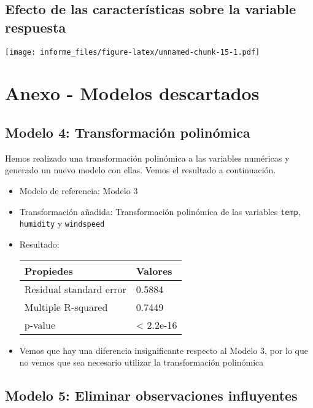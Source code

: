 \documentclass[
]{article}
\begin{document}
\hypertarget{efecto-de-las-caracteruxedsticas-sobre-la-variable-respuesta}{%
\subsection{Efecto de las características sobre la variable
respuesta}\label{efecto-de-las-caracteruxedsticas-sobre-la-variable-respuesta}}

\texttt{[image: informe\_files/figure-latex/unnamed-chunk-15-1.pdf]}

\newpage

\hypertarget{anexo---modelos-descartados}{%
\section{Anexo - Modelos
descartados}\label{anexo---modelos-descartados}}

\hypertarget{modelo-4-transformaciuxf3n-polinuxf3mica}{%
\subsection{Modelo 4: Transformación
polinómica}\label{modelo-4-transformaciuxf3n-polinuxf3mica}}

Hemos realizado una transformación polinómica a las variables numéricas
y generado un nuevo modelo con ellas. Vemos el resultado a continuación.

\begin{itemize}
\item
  Modelo de referencia: Modelo 3
\item
  Transformación añadida: Transformación polinómica de las variables
  \texttt{temp}, \texttt{humidity} y \texttt{windspeed}
\item
  Resultado:

  \begin{longtable}[]{@{}ll@{}}
  \toprule
  Propiedes & Valores\tabularnewline
  \midrule
  \endhead
  Residual standard error & 0.5884\tabularnewline
  Multiple R-squared & 0.7449\tabularnewline
  p-value & \textless{} 2.2e-16\tabularnewline
  \bottomrule
  \end{longtable}
\item
  Vemos que hay una diferencia insignificante respecto al Modelo 3, por
  lo que no vemos que sea necesario utilizar la transformación
  polinómica
\end{itemize}

\hypertarget{modelo-5-eliminar-observaciones-influyentes}{%
\subsection{Modelo 5: Eliminar observaciones
influyentes}\label{modelo-5-eliminar-observaciones-influyentes}}
\end{document}
